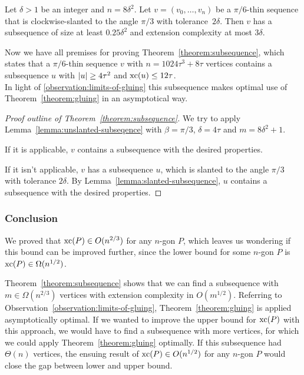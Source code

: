 \begin{lemma}\label{lemma:slanted-subsequence}
  Let $\delta>1$ be an integer and $n=8\delta^2$. Let $v=(v_0,\ldots,v_n)$ be a $\pi/6$-thin sequence that is clockwise-slanted to the angle $\pi/3$ with tolerance~$2\delta$. Then $v$ has a subsequence of size at least $0.25\delta^2$ and extension complexity at most $3\delta$.
\end{lemma}

Now we have all premises for proving Theorem~\ref{theorem:subsequence}, which states that a $\pi/6$-thin sequence $v$ with $n = 1024\tau^3 + 8\tau$ vertices contains a subsequence $u$ with $\lvert u\rvert \geq 4\tau^2$ and $\operatorname{xc}(u) \leq 12\tau$.\\
In light of \ref{observation:limits-of-gluing} this subsequence makes optimal use of Theorem~\ref{theorem:gluing} in an asymptotical way.

\begin{proof}[Proof outline of Theorem~\ref{theorem:subsequence}]
  We try to apply Lemma~\ref{lemma:unslanted-subseqence} with $\beta = \pi/3$, $\delta = 4\tau$ and $m = 8\delta^2 + 1$.

  If it is applicable, $v$ contains a subsequence with the desired properties.

  If it isn't applicable, $v$ has a subsequence $u$, which is slanted to the angle $\pi/3$ with tolerance $2\delta$. By Lemma~\ref{lemma:slanted-subsequence}, $u$ contains a subsequence with the desired properties.
\end{proof}



\subsubsection{Conclusion}

We proved that $\operatorname{xc}(P) \in O(n^{2/3})$ for any $n$-gon $P$, which leaves us wondering if this bound can be improved further, since the lower bound for some $n$-gon $P$ is $\operatorname{xc}(P) \in \Omega(n^{1/2})$.

Theorem~\ref{theorem:subsequence} shows that we can find a subsequence with $m \in \Omega(n^{2/3})$ vertices with extension complexity in $O(m^{1/2})$. Referring to Observation~\ref{observation:limits-of-gluing}, Theorem~\ref{theorem:gluing} is applied asymptotically optimal.
If we wanted to improve the upper bound for $\operatorname{xc}(P)$ with this approach, we would have to find a subsequence with more vertices, for which we could apply Theorem~\ref{theorem:gluing} optimally. If this subsequence had $\Theta(n)$ vertices, the ensuing result of $\operatorname{xc}(P) \in O(n^{1/2})$ for any $n$-gon $P$ would close the gap between lower and upper bound.
